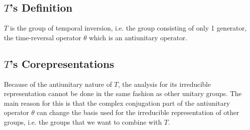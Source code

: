 \documentclass[preprint, 12pt]{revtex4-2}
\numberwithin{equation}{section}
\begin{document}
\subsection{$T$'s Definition}
$T$ is the group of temporal inversion, i.e. the group consisting of only 1 generator, the time-reversal operator $\theta$ which is an antiunitary operator.

\subsection{$T$'s Corepresentations}
Because of the antiunitary nature of $T$, the analysis for its irreducible representation cannot be done in the same fashion as other unitary groups. The main reason for this is that the complex conjugation part of the antiunitary operator $\theta$ can change the basis used for the irreducible representation of other groups, i.e. the groups that we want to combine with $T$.
\end{document}
